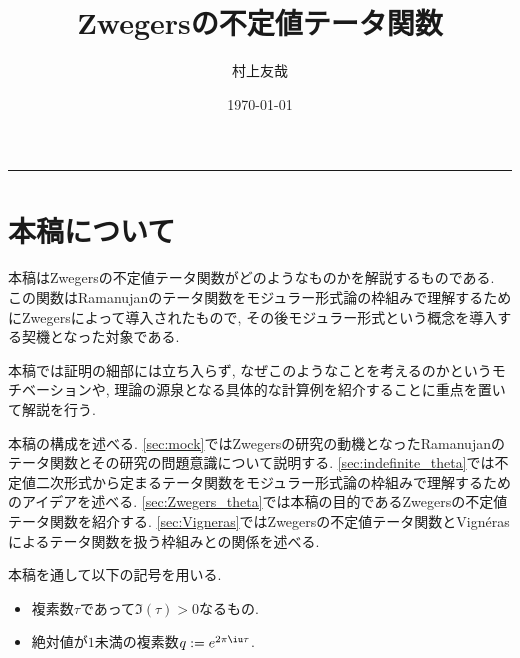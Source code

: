 \documentclass[11pt,b5paper,oneside,lualatex]{ltjsarticle} %
\makeatletter
\numberwithin{equation}{section} %
\renewcommand{\maketitle}{\begin{titlepage}%
		\let\footnotesize\small
		\let\footnoterule\relax
		\parindent \z@
		\reset@font
		\null\vfil
		\begin{center}
			\Huge \@title
		\end{center}
		\par
		\hrule height 4pt
		\par
		\vskip 40\p@
		\begin{flushright}
			\LARGE \@author \par
		\end{flushright}
		\vskip 30\p@
		\begin{flushright}
			{\large \@date}%
		\end{flushright}
		\vskip 30\p@		
		\begin{contentsbox}
			\makeatletter
			\@starttoc{toc}
			\makeatother
		\end{contentsbox}
	\end{titlepage}%
	\setcounter{footnote}{0}%
}
\makeatother
\begin{document}

\title{Zwegersの不定値テータ関数}
\author{村上友哉}
\date{\today}

\maketitle




\section{本稿について} \label{sec:intro}


本稿はZwegersの不定値テータ関数がどのようなものかを解説するものである. 
この関数はRamanujanのテータ関数をモジュラー形式論の枠組みで理解するためにZwegersによって導入されたもので, その後モジュラー形式という概念を導入する契機となった対象である. 

本稿では証明の細部には立ち入らず, なぜこのようなことを考えるのかというモチベーションや, 理論の源泉となる具体的な計算例を紹介することに重点を置いて解説を行う.

本稿の構成を述べる. 
\cref{sec:mock}ではZwegersの研究の動機となったRamanujanのテータ関数とその研究の問題意識について説明する.
\cref{sec:indefinite_theta}では不定値二次形式から定まるテータ関数をモジュラー形式論の枠組みで理解するためのアイデアを述べる. 
\cref{sec:Zwegers_theta}では本稿の目的であるZwegersの不定値テータ関数を紹介する. 
\cref{sec:Vigneras}ではZwegersの不定値テータ関数とVign\'{e}rasによるテータ関数を扱う枠組みとの関係を述べる. 

本稿を通して以下の記号を用いる. 

\begin{symb}{}{}
	\begin{itemize}
		\item 複素数$ \tau $であって$ \Im(\tau) > 0 $なるもの.
		\item 絶対値が$ 1 $未満の複素数$ q := e^{2\pi\iu\tau} $.
	\end{itemize}
\end{symb}
\end{document}
